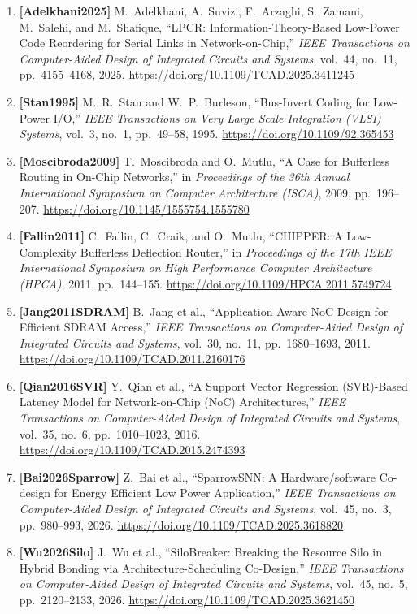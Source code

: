 \begin{enumerate}
    \item \textbf{[Adelkhani2025]} M.~Adelkhani, A.~Suvizi, F.~Arzaghi, S.~Zamani, M.~Salehi, and M.~Shafique, ``LPCR: Information-Theory-Based Low-Power Code Reordering for Serial Links in Network-on-Chip,'' \emph{IEEE Transactions on Computer-Aided Design of Integrated Circuits and Systems}, vol.~44, no.~11, pp.~4155--4168, 2025. \url{https://doi.org/10.1109/TCAD.2025.3411245}
    \item \textbf{[Stan1995]} M.~R.~Stan and W.~P.~Burleson, ``Bus-Invert Coding for Low-Power I/O,'' \emph{IEEE Transactions on Very Large Scale Integration (VLSI) Systems}, vol.~3, no.~1, pp.~49--58, 1995. \url{https://doi.org/10.1109/92.365453}
    \item \textbf{[Moscibroda2009]} T.~Moscibroda and O.~Mutlu, ``A Case for Bufferless Routing in On-Chip Networks,'' in \emph{Proceedings of the 36th Annual International Symposium on Computer Architecture (ISCA)}, 2009, pp.~196--207. \url{https://doi.org/10.1145/1555754.1555780}
    \item \textbf{[Fallin2011]} C.~Fallin, C.~Craik, and O.~Mutlu, ``CHIPPER: A Low-Complexity Bufferless Deflection Router,'' in \emph{Proceedings of the 17th IEEE International Symposium on High Performance Computer Architecture (HPCA)}, 2011, pp.~144--155. \url{https://doi.org/10.1109/HPCA.2011.5749724}
    \item \textbf{[Jang2011SDRAM]} B.~Jang et al., ``Application-Aware NoC Design for Efficient SDRAM Access,'' \emph{IEEE Transactions on Computer-Aided Design of Integrated Circuits and Systems}, vol.~30, no.~11, pp.~1680--1693, 2011. \url{https://doi.org/10.1109/TCAD.2011.2160176}
    \item \textbf{[Qian2016SVR]} Y.~Qian et al., ``A Support Vector Regression (SVR)-Based Latency Model for Network-on-Chip (NoC) Architectures,'' \emph{IEEE Transactions on Computer-Aided Design of Integrated Circuits and Systems}, vol.~35, no.~6, pp.~1010--1023, 2016. \url{https://doi.org/10.1109/TCAD.2015.2474393}
    \item \textbf{[Bai2026Sparrow]} Z.~Bai et al., ``SparrowSNN: A Hardware/software Co-design for Energy Efficient Low Power Application,'' \emph{IEEE Transactions on Computer-Aided Design of Integrated Circuits and Systems}, vol.~45, no.~3, pp.~980--993, 2026. \url{https://doi.org/10.1109/TCAD.2025.3618820}
    \item \textbf{[Wu2026Silo]} J.~Wu et al., ``SiloBreaker: Breaking the Resource Silo in Hybrid Bonding via Architecture-Scheduling Co-Design,'' \emph{IEEE Transactions on Computer-Aided Design of Integrated Circuits and Systems}, vol.~45, no.~5, pp.~2120--2133, 2026. \url{https://doi.org/10.1109/TCAD.2025.3621450}

\end{enumerate}
